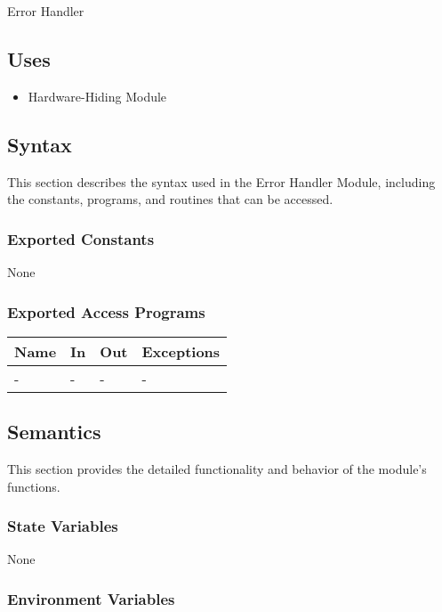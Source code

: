 \documentclass[12pt, titlepage]{article}
\begin{document}
Error Handler

\subsection{Uses}

\begin{itemize}
\item Hardware-Hiding Module
\end{itemize}

\subsection{Syntax}

This section describes the syntax used in the Error Handler Module, including
the constants, programs, and routines that can be accessed.

\subsubsection{Exported Constants}

None

\subsubsection{Exported Access Programs}

\begin{center}
\begin{tabular}{p{2cm} p{4cm} p{4cm} p{2cm}}
\hline
\textbf{Name} & \textbf{In} & \textbf{Out} & \textbf{Exceptions} \\
\hline
- & - & - & - \\
\hline
\end{tabular}
\end{center}

\subsection{Semantics}

This section provides the detailed functionality and behavior of the module’s
functions.

\subsubsection{State Variables}

None

\subsubsection{Environment Variables}
\end{document}
